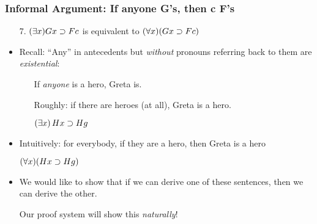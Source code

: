 \begin{frame}
\frametitle{Informal Argument: If anyone G's, then c F's}

\begin{itemize}[<+->]

\item[7.] $(\exists x)Gx \supset Fc$ is equivalent to $(\forall x)(Gx \supset Fc)$

\item Recall: ``Any'' in antecedents but \emph{without} pronouns referring back to
  them are \emph{existential}:
  \begin{itemize}[<+->]
    \item[] If \emph{anyone} is a hero, Greta is.
    \item[] Roughly: if there are heroes (at all), Greta is a hero.
    \item[] \alert{$(\exists x)\, Hx \supset Hg$}
  \end{itemize}


\item Intuitively: for everybody, if they are a hero, then Greta is a hero

\bi
 \item[] \alert{$(\forall x)(Hx \supset Hg)$}
\ei

\item We would like to show that if we can derive one of these sentences, then we can derive the other. 

\item[] Our proof system will show this \textit{naturally}!


\end{itemize}
\end{frame}

